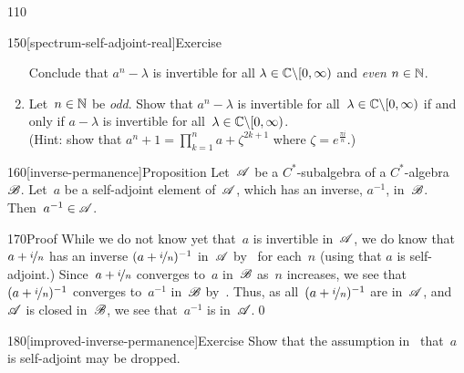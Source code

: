 \begin{parsec}{110}
\begin{point}{150}[spectrum-self-adjoint-real]{Exercise}
\begin{enumerate}
Conclude that $a^n-\lambda$ is invertible for all 
$\lambda\in\mathbb{C}\backslash[0,\infty)$ and \emph{even} $n\in\mathbb{N}$.
\item
Let~$n\in \mathbb{N}$ be \emph{odd}.
Show that $a^n-\lambda$ is invertible
for all~$\lambda\in \mathbb{C}\backslash[0,\infty)$
if and only if $a-\lambda$ is invertible
for all~$\lambda\in \mathbb{C}\backslash[0,\infty)$.\\
(Hint: show that
$a^n+1= \prod_{k=1}^n a+\zeta^{2k+1}$
where $\zeta=e^{\frac{\pi i}{n}}$.)
\end{enumerate}%
\spacingfix{}
\end{point}%
\begin{point}{160}[inverse-permanence]{Proposition}%
Let~$\mathscr{A}$ be a $C^*$-subalgebra
of a $C^*$-algebra $\mathscr{B}$.
Let~$a$ be a self-adjoint element of~$\mathscr{A}$,
which has an inverse, $a^{-1}$, in~$\mathscr{B}$.
Then~$a^{-1}\in\mathscr{A}$.
\begin{point}{170}{Proof}%
While we do not know yet that~$a$ is invertible in~$\mathscr{A}$,
we do know that~$a+\nicefrac{i}{n}$ 
has an inverse $(a+\nicefrac{i}{n})^{-1}$ in~$\mathscr{A}$
by~
for each~$n$
(using that $a$ is self-adjoint.)
Since~$a+\nicefrac{i}{n}$ converges to~$a$ in~$\mathscr{B}$ as~$n$ increases,
we see that $(a+\nicefrac{i}{n})^{-1}$ converges to~$a^{-1}$
in~$\mathscr{B}$ by~.
Thus, as all~$(a+\nicefrac{i}{n})^{-1}$ are in~$\mathscr{A}$,
and~$\mathscr{A}$ is closed in~$\mathscr{B}$,
we see that~$a^{-1}$ is in~$\mathscr{A}$.\qed
\end{point}
\end{point}
\begin{point}{180}[improved-inverse-permanence]{Exercise}%
	Show that the assumption in~ 
	that~$a$ is self-adjoint
may be dropped. 


\end{point}
\end{parsec}
